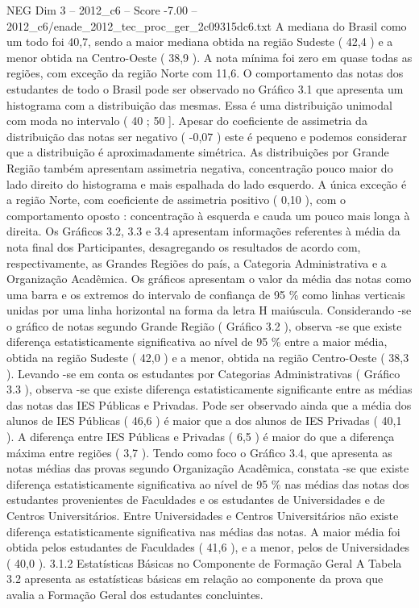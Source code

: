 \begin{textsample}{NEG Dim 3 – 2012\_c6 – Score -7.00 – 2012\_c6/enade\_2012\_tec\_proc\_ger\_2c09315dc6.txt}
A mediana do Brasil como um todo foi 40,7, sendo a maior mediana obtida na região Sudeste ( 42,4 ) e a menor obtida na Centro-Oeste ( 38,9 ).
A nota mínima foi zero em quase todas as regiões, com exceção da região Norte com 11,6.
O comportamento das notas dos estudantes de todo o Brasil pode ser observado no Gráfico 3.1 que apresenta um histograma com a distribuição das mesmas.
Essa é uma distribuição unimodal com moda no intervalo ( 40 ; 50 ].
Apesar do coeficiente de assimetria da distribuição das notas ser negativo ( -0,07 ) este é pequeno e podemos considerar que a distribuição é aproximadamente simétrica.
As distribuições por Grande Região também apresentam assimetria negativa, concentração pouco maior do lado direito do histograma e mais espalhada do lado esquerdo.
A única exceção é a região Norte, com coeficiente de assimetria positivo ( 0,10 ), com o comportamento oposto : concentração à esquerda e cauda um pouco mais longa à direita.
Os Gráficos 3.2, 3.3 e 3.4 apresentam informações referentes à média da nota final dos Participantes, desagregando os resultados de acordo com, respectivamente, as Grandes Regiões do país, a Categoria Administrativa e a Organização Acadêmica.
Os gráficos apresentam o valor da média das notas como uma barra e os extremos do intervalo de confiança de 95 \% como linhas verticais unidas por uma linha horizontal na forma da letra H maiúscula.
Considerando -se o gráfico de notas segundo Grande Região ( Gráfico 3.2 ), observa -se que existe diferença estatisticamente significativa ao nível de 95 \% entre a maior média, obtida na região Sudeste ( 42,0 ) e a menor, obtida na região Centro-Oeste ( 38,3 ).
Levando -se em conta os estudantes por Categorias Administrativas ( Gráfico 3.3 ), observa -se que existe diferença estatisticamente significante entre as médias das notas das IES Públicas e Privadas.
Pode ser observado ainda que a média dos alunos de IES Públicas ( 46,6 ) é maior que a dos alunos de IES Privadas ( 40,1 ).
A diferença entre IES Públicas e Privadas ( 6,5 ) é maior do que a diferença máxima entre regiões ( 3,7 ).
Tendo como foco o Gráfico 3.4, que apresenta as notas médias das provas segundo Organização Acadêmica, constata -se que existe diferença estatisticamente significativa ao nível de 95 \% nas médias das notas dos estudantes provenientes de Faculdades e os estudantes de Universidades e de Centros Universitários.
Entre Universidades e Centros Universitários não existe diferença estatisticamente significativa nas médias das notas.
A maior média foi obtida pelos estudantes de Faculdades ( 41,6 ), e a menor, pelos de Universidades ( 40,0 ). 3.1.2 Estatísticas Básicas no Componente de Formação Geral A Tabela 3.2 apresenta as estatísticas básicas em relação ao componente da prova que avalia a Formação Geral dos estudantes concluintes.

\end{textsample}
